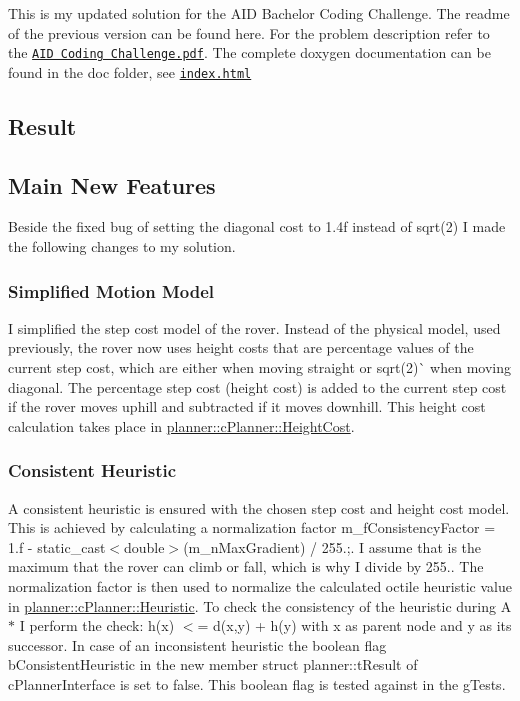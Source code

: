 This is my updated solution for the A\+ID Bachelor Coding Challenge. The readme of the previous version can be found here. For the problem description refer to the \href{AID_Coding_Challenge.pdf}{\tt A\+ID Coding Challenge.\+pdf}. The complete doxygen documentation can be found in the doc folder, see \href{doc/html/index.html}{\tt index.\+html}

\subsection*{Result}



\subsection*{Main New Features}

Beside the fixed bug of setting the diagonal cost to 1.\+4f instead of sqrt(2) I made the following changes to my solution.

\subsubsection*{Simplified Motion Model}

I simplified the step cost model of the rover. Instead of the physical model, used previously, the rover now uses height costs that are percentage values of the current step cost, which are either {} when moving straight or sqrt(2)\`{} when moving diagonal. The percentage step cost (height cost) is added to the current step cost if the rover moves uphill and subtracted if it moves downhill. This height cost calculation takes place in \mbox{\hyperlink{classplanner_1_1c_planner_a9d57a0697bb0e4666f4fd45f77c4a1aa}{planner\+::c\+Planner\+::\+Height\+Cost}}.

\subsubsection*{Consistent Heuristic}

A consistent heuristic is ensured with the chosen step cost and height cost model. This is achieved by calculating a normalization factor {\ttfamily m\+\_\+f\+Consistency\+Factor = 1.\+f -\/ static\+\_\+cast$<$double$>$(m\+\_\+n\+Max\+Gradient) / 255.;}. I assume that {} is the maximum that the rover can climb or fall, which is why I divide by 255.. The normalization factor is then used to normalize the calculated octile heuristic value in \mbox{\hyperlink{classplanner_1_1c_planner_a77cefeae3d7a58a96c74b66f6be22611}{planner\+::c\+Planner\+::\+Heuristic}}. To check the consistency of the heuristic during A$\ast$ I perform the check\+: h(x) $<$= d(x,y) + h(y) with x as parent node and y as its successor. In case of an inconsistent heuristic the boolean flag b\+Consistent\+Heuristic in the new member struct planner\+::t\+Result of c\+Planner\+Interface is set to false. This boolean flag is tested against in the g\+Tests.

